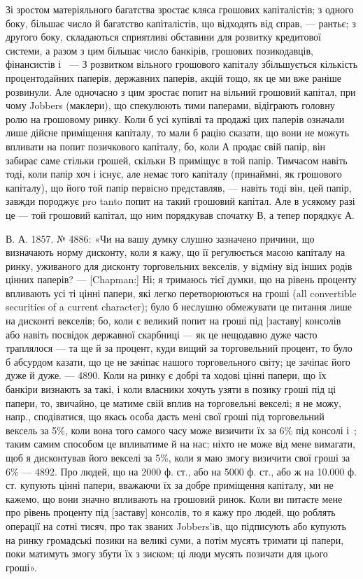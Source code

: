 Зі зростом матеріяльного багатства зростає кляса грошових капіталістів;
з одного боку, більшає число й багатство капіталістів, що відходять від справ, —
рантьє; з другого боку, складаються сприятливі обставини для розвитку кредитової
системи, а разом з цим більшає число банкірів, грошових позикодавців, фінансистів
і~ — З розвитком вільного грошового капіталу збільшується кількість
процентодайних паперів, державних паперів, акцій тощо, як це ми вже раніше
розвинули. Але одночасно з цим зростає попит на вільний грошовий капітал, при
чому Jobbers (маклери), що спекулюють тими паперами, відіграють головну ролю на
грошовому ринку. Коли б усі купівлі та продажі цих паперів означали лише
дійсне приміщення капіталу, то мали б рацію сказати, що вони не можуть
впливати на попит позичкового капіталу, бо, коли А продає свій папір, він
забирає саме стільки грошей, скільки B приміщує в той папір. Тимчасом навіть
тоді, коли папір хоч і існує, але немає того капіталу (принаймні, як грошового
капіталу), що його той папір первісно представляв, — навіть тоді він, цей папір,
завжди породжує pro tanto попит на такий грошовий капітал. Але в усякому
разі це — той грошовий капітал, що ним порядкував спочатку В, а тепер
порядкує А.

В. А. 1857. № 4886: «Чи на вашу думку слушно зазначено причини,
що визначають норму дисконту, коли я кажу, що її регулюється масою капіталу
на ринку, уживаного для дисконту торговельних векселів, у відміну від
інших родів цінних паперів? — [Chapman:] Ні; я тримаюсь тієї думки, що на
рівень проценту впливають усі ті цінні папери, які легко перетворюються
на гроші (all convertible securities of a current character); було б неслушно
обмежувати це питання лише на дисконті векселів; бо, коли є великий попит
на гроші під [заставу] консолів або навіть посвідок державної скарбниці — як
це нещодавно дуже часто траплялося — та ще й за процент, куди вищий за
торговельний процент, то було б абсурдом казати, що це не зачіпає нашого торговельного
світу; це зачіпає його дуже й дуже. — 4890. Коли на ринку є добрі
та ходові цінні папери, що їх банкіри визнають за такі, і коли власники
хочуть узяти в позику гроші під ці папери, то, звичайно, це матиме свій вплив на
торговельні векселі; я не можу, напр., сподіватися, що якась особа дасть мені
свої гроші під торговельний вексель за 5\%, коли вона того самого часу може
визичити їх за 6\% під консолі і~; таким самим способом це впливатиме й на
нас; ніхто не може від мене вимагати, щоб я дисконтував його векселі за 5\%,
коли я маю змогу визичити свої гроші за 6\% — 4892. Про людей, що на 2000
ф. ст., або на 5000 ф. ст., або ж на 10.000 ф. ст. купують цінні папери, вважаючи
їх за добре приміщення капіталу, ми не кажемо, що вони значно впливають
на грошовий ринок. Коли ви питаєте мене про рівень проценту під [заставу]
консолів, то я кажу про людей, що роблять операції на сотні тисяч, про так
званих Jobbers’iв, що підписують або купують на ринку громадські позики на
великі суми, а потім мусять тримати ці папери, поки матимуть змогу збути їх
з зиском; ці люди мусять позичати для цього гроші».

